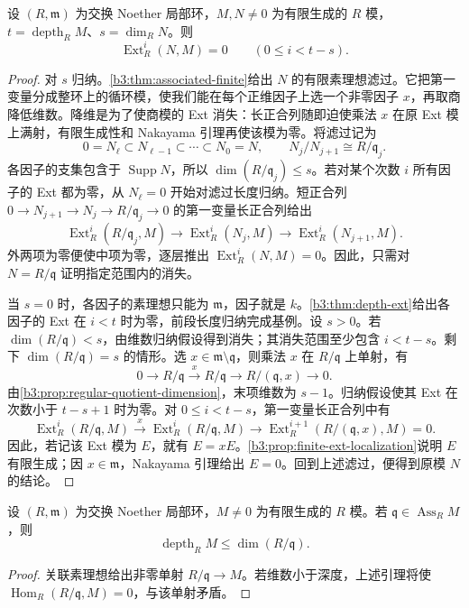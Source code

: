\begin{lemma}\label{b3:lem:ischebeck-vanishing}
	设 \((R,\mathfrak m)\) 为交换 Noether 局部环，\(M,N\ne0\) 为有限生成的 \(R\) 模，\(t=\operatorname{depth}_RM\)、\(s=\dim_RN\)。则
	\[
		\operatorname{Ext}_R^i(N,M)=0\qquad(0\le i<t-s).
	\]
\end{lemma}
\begin{proof}
	对 \(s\) 归纳。\cref{b3:thm:associated-finite}给出 \(N\) 的有限素理想滤过。它把第一变量分成整环上的循环模，使我们能在每个正维因子上选一个非零因子 \(x\)，再取商降低维数。降维是为了使商模的 Ext 消失：长正合列随即迫使乘法 \(x\) 在原 Ext 模上满射，有限生成性和 Nakayama 引理再使该模为零。将滤过记为
	\[
		0=N_\ell\subset N_{\ell-1}\subset\cdots\subset N_0=N, \qquad N_j/N_{j+1}\cong R/\mathfrak q_j.
	\]
	各因子的支集包含于 \(\operatorname{Supp}N\)，所以 \(\dim(R/\mathfrak q_j)\le s\)。若对某个次数 \(i\) 所有因子的 Ext 都为零，从 \(N_\ell=0\) 开始对滤过长度归纳。短正合列 \(0\rightarrow N_{j+1}\rightarrow N_j\rightarrow R/\mathfrak q_j\rightarrow0\) 的第一变量长正合列给出
	\[
		\operatorname{Ext}_R^i(R/\mathfrak q_j,M) \longrightarrow\operatorname{Ext}_R^i(N_j,M) \longrightarrow\operatorname{Ext}_R^i(N_{j+1},M).
	\]
	外两项为零便使中项为零，逐层推出 \(\operatorname{Ext}_R^i(N,M)=0\)。因此，只需对 \(N=R/\mathfrak q\) 证明指定范围内的消失。

	当 \(s=0\) 时，各因子的素理想只能为 \(\mathfrak m\)，因子就是 \(k\)。\cref{b3:thm:depth-ext}给出各因子的 Ext 在 \(i<t\) 时为零，前段长度归纳完成基例。设 \(s>0\)。若 \(\dim(R/\mathfrak q)<s\)，由维数归纳假设得到消失；其消失范围至少包含 \(i<t-s\)。剩下 \(\dim(R/\mathfrak q)=s\) 的情形。选 \(x\in\mathfrak m\setminus\mathfrak q\)，则乘法 \(x\) 在 \(R/\mathfrak q\) 上单射，有
	\[
		0\longrightarrow R/\mathfrak q\xrightarrow{x}R/\mathfrak q \longrightarrow R/(\mathfrak q,x)\longrightarrow0.
	\]
	由\cref{b3:prop:regular-quotient-dimension}，末项维数为 \(s-1\)。归纳假设使其 Ext 在次数小于 \(t-s+1\) 时为零。对 \(0\le i<t-s\)，第一变量长正合列中有
	\[
		\operatorname{Ext}_R^i(R/\mathfrak q,M) \xrightarrow{x}\operatorname{Ext}_R^i(R/\mathfrak q,M) \longrightarrow\operatorname{Ext}_R^{i+1}(R/(\mathfrak q,x),M)=0.
	\]
	因此，若记该 Ext 模为 \(E\)，就有 \(E=xE\)。\cref{b3:prop:finite-ext-localization}说明 \(E\) 有限生成；因 \(x\in\mathfrak m\)，Nakayama 引理给出 \(E=0\)。回到上述滤过，便得到原模 \(N\) 的结论。
\end{proof}

\begin{corollary}\label{b3:cor:associated-depth-bound}
	设 \((R,\mathfrak m)\) 为交换 Noether 局部环，\(M\ne0\) 为有限生成的 \(R\) 模。若 \(\mathfrak q\in\operatorname{Ass}_RM\)，则
	\[
		\operatorname{depth}_RM\le\dim(R/\mathfrak q).
	\]
\end{corollary}
\begin{proof}
	关联素理想给出非零单射 \(R/\mathfrak q\rightarrow M\)。若维数小于深度，上述引理将使 \(\operatorname{Hom}_R(R/\mathfrak q,M)=0\)，与该单射矛盾。
\end{proof}

